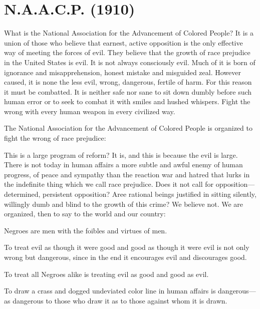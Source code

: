 \documentclass[letterpaper,10pt,english]{jupyterBook}
\begin{document}
\section{N.A.A.C.P. (1910)}
\label{\detokenize{Volumes/01/02/NAACP:n-a-a-c-p-1910}}\label{\detokenize{Volumes/01/02/NAACP::doc}}
\sphinxAtStartPar
What is the National Association for the Advancement of Colored People? It is a union of those who believe that earnest, active opposition is the only effective way of meeting the forces of evil. They believe that the growth of race prejudice in the United States is evil. It is not always consciously evil. Much of it is born of ignorance and misapprehension, honest mistake and misguided zeal. However caused, it is none the less evil, wrong, dangerous, fertile of harm. For this reason it must be combatted. It is neither safe nor sane to sit down dumbly before such human error or to seek to combat it with smiles and hushed whispers. Fight the wrong with every human weapon in every civilized way.

\sphinxAtStartPar
The National Association for the Advancement of Colored People is organized to fight the wrong of race prejudice:



\sphinxAtStartPar
This is a large program of reform? It is, and this is because the evil is large. There is not to\sphinxhyphen{}day in human affairs a more subtle and awful enemy of human progress, of peace and sympathy than the reaction war and hatred that lurks in the indefinite thing which we call race prejudice. Does it not call for opposition—determined, persistent opposition? Aree rational beings justified in sitting silently, willingly dumb and blind to the growth of this crime? We believe not. We are organized, then to say to the world and our country:

\sphinxAtStartPar
Negroes are men with the foibles and virtues of men.

\sphinxAtStartPar
To treat evil as though it were good and good as though it were evil is not only wrong but dangerous, since in the end it encourages evil and discourages good.

\sphinxAtStartPar
To treat all Negroes alike is treating evil as good and good as evil.

\sphinxAtStartPar
To draw a crass and dogged undeviated color line in human affairs is dangerous—as dangerous to those who draw it as to those against whom it is drawn.
\end{document}
